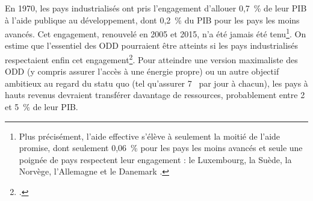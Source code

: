 \documentclass[a5paper,french,openany]{memoir}
\begin{document}
En 1970, les pays industrialisés ont pris l'engagement d'allouer 0,7~\% de leur PIB à l'aide publique au développement, dont 0,2~\% du PIB pour les pays les moins avancés. Cet engagement, renouvelé en 2005 et 2015, n'a été jamais été tenu\footnote{Plus précisément, l'aide effective s'élève à seulement la moitié de l'aide promise, dont seulement 0,06~\% pour les pays les moins avancés et seule une poignée de pays respectent leur engagement : le Luxembourg, la Suède, la Norvège, l'Allemagne et le Danemark 
\citep{oecd_oda_2023}.}. 
On estime que l'essentiel des ODD pourraient être atteints si les pays industrialisés respectaient enfin cet engagement\footnote{\citet{sdsn_sdg_2019}.}. Pour atteindre une version maximaliste des ODD (y compris assurer l'accès à une énergie propre) ou un autre objectif ambitieux au regard du statu quo (tel qu'assurer 7~\textit{\texteuro{}} par jour à chacun), les pays à hauts revenus devraient transférer davantage de ressources, probablement entre 2 et 5~\% 
de leur PIB. %

\end{document}
